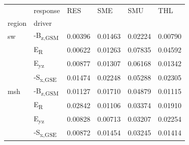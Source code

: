 \begin{tabular}{llllll}
\toprule
 & response & RES & SME & SMU & THL \\
region & driver &  &  &  &  \\
\midrule
sw & -B\textsubscript{z,GSM} & 0.00396 & 0.01463 & 0.02224 & 0.00790 \\
 & E\textsubscript{R} & 0.00622 & 0.01263 & 0.07835 & 0.04592 \\
 & E\textsubscript{yz} & 0.00877 & 0.01307 & 0.06168 & 0.01342 \\
 & -S\textsubscript{x,GSE} & 0.01474 & 0.02248 & 0.05288 & 0.02305 \\
msh & -B\textsubscript{z,GSM} & 0.01127 & 0.01710 & 0.04879 & 0.01115 \\
 & E\textsubscript{R} & 0.02842 & 0.01106 & 0.03374 & 0.01910 \\
 & E\textsubscript{yz} & 0.00828 & 0.00713 & 0.03207 & 0.02254 \\
 & -S\textsubscript{x,GSE} & 0.00872 & 0.01454 & 0.03245 & 0.01414 \\
\bottomrule
\end{tabular}
